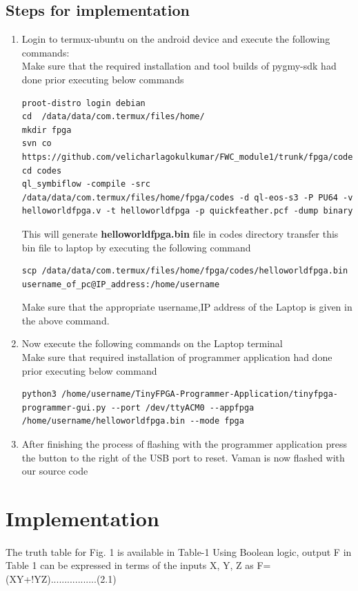 \documentclass[10pt, a4paper]{article}
\begin{document}
\subsection{Steps for implementation}
\begin{enumerate}
\item Login to termux-ubuntu on the android device and execute the following commands:\\
Make sure that the required installation and tool builds of pygmy-sdk had done prior executing below commands
\begin{lstlisting}
proot-distro login debian
cd  /data/data/com.termux/files/home/
mkdir fpga
svn co https://github.com/velicharlagokulkumar/FWC_module1/trunk/fpga/codes
cd codes
ql_symbiflow -compile -src /data/data/com.termux/files/home/fpga/codes -d ql-eos-s3 -P PU64 -v helloworldfpga.v -t helloworldfpga -p quickfeather.pcf -dump binary
\end{lstlisting}
This will generate \textbf{helloworldfpga.bin} file in codes directory transfer this bin file to laptop by executing the following command
\begin{lstlisting}
scp /data/data/com.termux/files/home/fpga/codes/helloworldfpga.bin username_of_pc@IP_address:/home/username
\end{lstlisting}
Make sure that the appropriate username,IP address of the Laptop is given in the above command.
\item Now execute the following commands on the Laptop terminal\\
Make sure that required installation of programmer application had done prior executing below command
\begin{lstlisting}
python3 /home/username/TinyFPGA-Programmer-Application/tinyfpga-programmer-gui.py --port /dev/ttyACM0 --appfpga /home/username/helloworldfpga.bin --mode fpga
\end{lstlisting}
\item After finishing the process of flashing with the programmer application press the button to the right of the USB port to reset. Vaman is now flashed with our source code
\end{enumerate}
\section{Implementation}
   	\paragraph{}
The truth table  for Fig. 1 is available in Table-1
Using Boolean logic, output F in Table 1 can be expressed in terms of the inputs X, Y, Z as F=(XY+!YZ).................(2.1)
\end{document}

